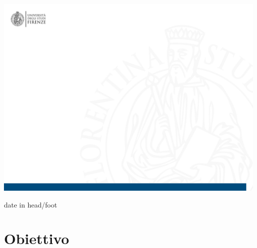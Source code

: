  
\frame{\titlepage} 


{\includegraphics[width=\paperwidth,height=\paperheight,keepaspectratio]{Immagine2}}





 
 
 
 
 
 
 
 {
 	\begin{beamercolorbox}[ht=1ex,sep=1ex, center]{date in head/foot}
 		\insertshorttitle \ \ \hspace{2cm}  \insertsection  \ \ \ \insertsubsection \hfill\insertframenumber%
 	\end{beamercolorbox}
 	
 }
 
 
 
 
 \section{Obiettivo}
 
